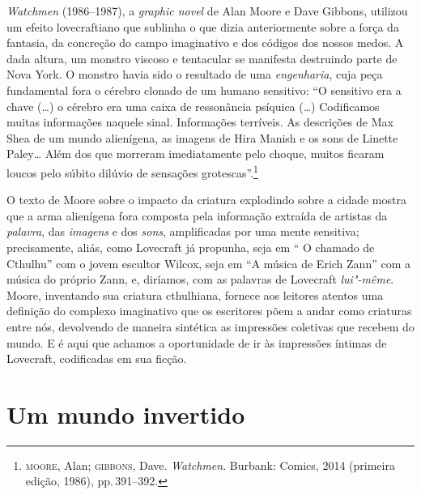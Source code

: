 \emph{Watchmen} (1986--1987), a \emph{graphic novel} de Alan Moore e Dave
Gibbons, utilizou um efeito lovecraftiano que sublinha o que dizia
anteriormente sobre a força da fantasia, da concreção do campo
imaginativo e dos códigos dos nossos medos. A dada altura, um monstro
viscoso e tentacular se manifesta destruindo parte de Nova York. O
monstro havia sido o resultado de uma \emph{engenharia}, cuja peça
fundamental fora o cérebro clonado de um humano sensitivo: ``O sensitivo
era a chave (\ldots{}) o cérebro era uma caixa de ressonância psíquica (\ldots{})
Codificamos muitas informações naquele sinal. Informações terríveis. As
descrições de Max Shea de um mundo alienígena, as imagens de Hira Manish
e os sons de Linette Paley\ldots{} Além dos que morreram imediatamente pelo
choque, muitos ficaram loucos pelo súbito dilúvio de sensações
grotescas''.\footnote{\textsc{moore}, Alan; \textsc{gibbons}, Dave. \emph{Watchmen}.
  Burbank:  Comics, 2014 (primeira edição, 1986), pp.\,391--392.}

O texto de Moore sobre o impacto da criatura explodindo sobre a cidade
mostra que a arma alienígena fora composta pela informação extraída de
artistas da \emph{palavra}, das \emph{imagens} e dos \emph{sons},
amplificadas por uma mente sensitiva; precisamente, aliás, como
Lovecraft já propunha, seja em `` O chamado de Cthulhu'' com o jovem
escultor Wilcox, seja em ``A música de Erich Zann'' com a música do
próprio Zann, e, diríamos, com as palavras de Lovecraft \emph{lui"-même}.
Moore, inventando sua criatura cthulhiana, fornece aos leitores atentos
uma definição do complexo imaginativo que os escritores põem a andar
como criaturas entre nós, devolvendo de maneira sintética as impressões
coletivas que recebem do mundo. E é aqui que achamos a oportunidade de
ir às impressões íntimas de Lovecraft, codificadas em sua ficção.

\section{Um mundo invertido}

